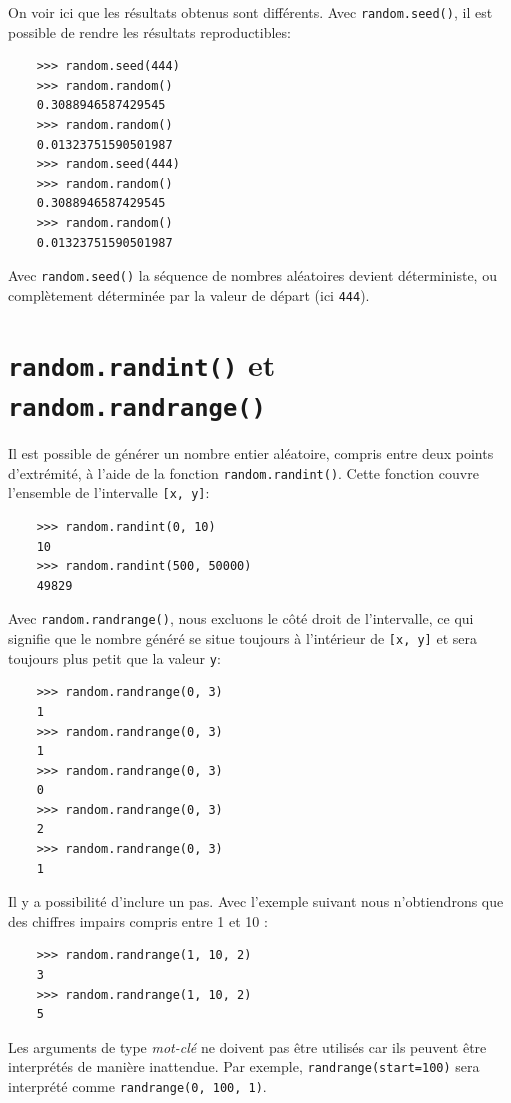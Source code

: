 \documentclass[a4paper,11pt]{book}
\begin{document}
On voir ici que les résultats obtenus sont différents. Avec \texttt{random.seed()}, il est possible de rendre les résultats reproductibles:
\begin{verbatim}
    >>> random.seed(444)
    >>> random.random()
    0.3088946587429545
    >>> random.random()
    0.01323751590501987
    >>> random.seed(444)
    >>> random.random()
    0.3088946587429545
    >>> random.random()
    0.01323751590501987
\end{verbatim}
\medskip

Avec \texttt{random.seed()} la séquence de nombres aléatoires devient déterministe, ou complètement déterminée par la valeur de départ (ici \texttt{444}).

\section{\texttt{random.randint()} et \texttt{random.randrange()}}
Il est possible de générer un nombre entier aléatoire, compris entre deux points d'extrémité, à l'aide de la fonction \texttt{random.randint()}. Cette fonction couvre l'ensemble de l'intervalle \texttt{[x, y]}:
\begin{verbatim}
    >>> random.randint(0, 10)
    10
    >>> random.randint(500, 50000)
    49829
\end{verbatim}
\medskip

Avec \texttt{random.randrange()}, nous excluons le côté droit de l'intervalle, ce qui signifie que le nombre généré se situe toujours à l'intérieur de \texttt{[x, y]} et sera toujours plus petit que la valeur \texttt{y}:
\begin{verbatim}
    >>> random.randrange(0, 3)
    1
    >>> random.randrange(0, 3)
    1
    >>> random.randrange(0, 3)
    0
    >>> random.randrange(0, 3)
    2
    >>> random.randrange(0, 3)
    1
\end{verbatim}
\medskip

Il y a possibilité d'inclure un pas. Avec l'exemple suivant nous n'obtiendrons que des chiffres impairs compris entre 1 et 10 :
\begin{verbatim}
    >>> random.randrange(1, 10, 2)
    3
    >>> random.randrange(1, 10, 2)
    5
\end{verbatim}
\medskip

Les arguments de type \textit{mot-clé} ne doivent pas être utilisés car ils peuvent être interprétés de manière inattendue. Par exemple, \texttt{randrange(start=100)} sera interprété comme \texttt{randrange(0, 100, 1)}.
\medskip
\end{document}

